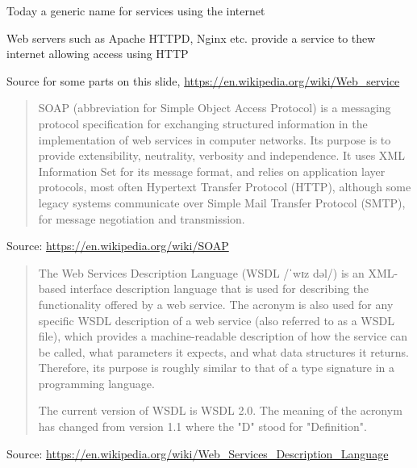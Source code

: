 \documentclass[Screen16to9,17pt]{foils}
\begin{document}







\begin{quote}

\end{quote}

\begin{list2}
\item Today a generic name for services using the internet
\item Web servers such as Apache HTTPD, Nginx etc. provide a service to thew internet allowing access using HTTP
\item Source for some parts on this slide, \url{https://en.wikipedia.org/wiki/Web_service}
\end{list2}






\begin{quote}
SOAP (abbreviation for Simple Object Access Protocol) is a messaging protocol specification for exchanging structured information in the implementation of web services in computer networks. Its purpose is to provide extensibility, neutrality, verbosity and independence. It uses XML Information Set for its message format, and relies on application layer protocols, most often Hypertext Transfer Protocol (HTTP), although some legacy systems communicate over Simple Mail Transfer Protocol (SMTP), for message negotiation and transmission.
\end{quote}
Source: \url{https://en.wikipedia.org/wiki/SOAP}

\begin{list2}
\item
\item
\end{list2}



\begin{quote}
  The Web Services Description Language (WSDL /ˈwɪz dəl/) is an XML-based interface description language that is used for describing the functionality offered by a web service. The acronym is also used for any specific WSDL description of a web service (also referred to as a WSDL file), which provides a machine-readable description of how the service can be called, what parameters it expects, and what data structures it returns. Therefore, its purpose is roughly similar to that of a type signature in a programming language.

  The current version of WSDL is WSDL 2.0. The meaning of the acronym has changed from version 1.1 where the "D" stood for "Definition".
\end{quote}
Source: \url{https://en.wikipedia.org/wiki/Web_Services_Description_Language}
\end{document}
